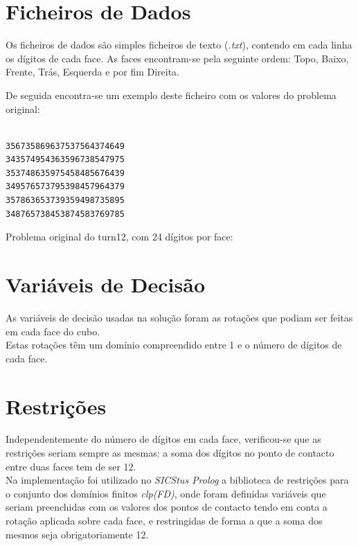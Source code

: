 
\section{Ficheiros de Dados}
\label{data:1}

Os ficheiros de dados são simples ficheiros de texto (\textit{.txt}), contendo em cada linha os dígitos de cada face.
As faces encontram-se pela seguinte ordem: Topo, Baixo, Frente, Trás, Esquerda e por fim Direita.

De seguida encontra-se um exemplo deste ficheiro com os valores do problema original:

\begin{f_exemplo}[H]
\begin{verbatim}

356735869637537564374649
343574954363596738547975
353748635975458485676439
349576573795398457964379
357863653739359498735895
348765738453874583769785
\end{verbatim}
\caption{Problema original do turn12, com 24 dígitos por face:}
\end{f_exemplo}




\section{Variáveis de Decisão}
\label{restr:1}

As variáveis de decisão usadas na solução foram as rotações que podiam ser feitas em cada face do cubo.\\
Estas rotações têm um domínio compreendido entre 1 e o número de dígitos de cada face.




\section{Restrições}
\label{restr:2}

Independentemente do número de dígitos em cada face, verificou-se que as restrições seriam sempre as mesmas: a soma dos dígitos no ponto de contacto entre duas faces tem de ser 12.\\

Na implementação foi utilizado no \textit{SICStus Prolog} a biblioteca de restrições para o conjunto dos domínios finitos \textit{clp(FD)}, onde foram definidas variáveis que seriam preenchidas com os valores dos pontos de contacto tendo em conta a rotação aplicada sobre cada face, e restringidas de forma a que a soma dos mesmos seja obrigatoriamente 12.



